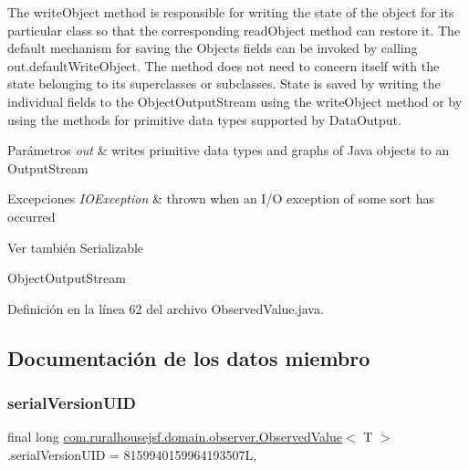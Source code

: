The write\+Object method is responsible for writing the state of the object for its particular class so that the corresponding read\+Object method can restore it. The default mechanism for saving the Object\textquotesingle{}s fields can be invoked by calling out.\+default\+Write\+Object. The method does not need to concern itself with the state belonging to its superclasses or subclasses. State is saved by writing the individual fields to the Object\+Output\+Stream using the write\+Object method or by using the methods for primitive data types supported by Data\+Output.


\begin{DoxyParams}{Parámetros}
{\em out} & writes primitive data types and graphs of Java objects to an Output\+Stream \\
\hline
\end{DoxyParams}

\begin{DoxyExceptions}{Excepciones}
{\em I\+O\+Exception} & thrown when an I/O exception of some sort has occurred \\
\hline
\end{DoxyExceptions}
\begin{DoxySeeAlso}{Ver también}
Serializable 

Object\+Output\+Stream 
\end{DoxySeeAlso}


Definición en la línea 62 del archivo Observed\+Value.\+java.



\subsection{Documentación de los datos miembro}
\mbox{\label{classcom_1_1ruralhousejsf_1_1domain_1_1observer_1_1_observed_value_a01052aac89cda6c5f230343d40b54e89}} 
\subsubsection{\texorpdfstring{serialVersionUID}{serialVersionUID}}
{\footnotesize\ttfamily final long \mbox{\hyperlink{classcom_1_1ruralhousejsf_1_1domain_1_1observer_1_1_observed_value}{com.\+ruralhousejsf.\+domain.\+observer.\+Observed\+Value}}$<$ T $>$.serial\+Version\+U\+ID = 8159940159964193507L\hspace{0.3cm}{\ttfamily [static]}, {\ttfamily [private]}}

